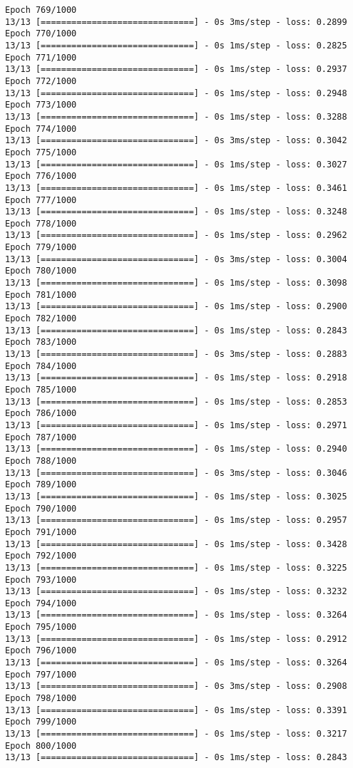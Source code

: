 \documentclass[11pt]{article}
\begin{document}
\begin{Verbatim}[commandchars=\\\{\}]
Epoch 769/1000
13/13 [==============================] - 0s 3ms/step - loss: 0.2899
Epoch 770/1000
13/13 [==============================] - 0s 1ms/step - loss: 0.2825
Epoch 771/1000
13/13 [==============================] - 0s 1ms/step - loss: 0.2937
Epoch 772/1000
13/13 [==============================] - 0s 1ms/step - loss: 0.2948
Epoch 773/1000
13/13 [==============================] - 0s 1ms/step - loss: 0.3288
Epoch 774/1000
13/13 [==============================] - 0s 3ms/step - loss: 0.3042
Epoch 775/1000
13/13 [==============================] - 0s 1ms/step - loss: 0.3027
Epoch 776/1000
13/13 [==============================] - 0s 1ms/step - loss: 0.3461
Epoch 777/1000
13/13 [==============================] - 0s 1ms/step - loss: 0.3248
Epoch 778/1000
13/13 [==============================] - 0s 1ms/step - loss: 0.2962
Epoch 779/1000
13/13 [==============================] - 0s 3ms/step - loss: 0.3004
Epoch 780/1000
13/13 [==============================] - 0s 1ms/step - loss: 0.3098
Epoch 781/1000
13/13 [==============================] - 0s 1ms/step - loss: 0.2900
Epoch 782/1000
13/13 [==============================] - 0s 1ms/step - loss: 0.2843
Epoch 783/1000
13/13 [==============================] - 0s 3ms/step - loss: 0.2883
Epoch 784/1000
13/13 [==============================] - 0s 1ms/step - loss: 0.2918
Epoch 785/1000
13/13 [==============================] - 0s 1ms/step - loss: 0.2853
Epoch 786/1000
13/13 [==============================] - 0s 1ms/step - loss: 0.2971
Epoch 787/1000
13/13 [==============================] - 0s 1ms/step - loss: 0.2940
Epoch 788/1000
13/13 [==============================] - 0s 3ms/step - loss: 0.3046
Epoch 789/1000
13/13 [==============================] - 0s 1ms/step - loss: 0.3025
Epoch 790/1000
13/13 [==============================] - 0s 1ms/step - loss: 0.2957
Epoch 791/1000
13/13 [==============================] - 0s 1ms/step - loss: 0.3428
Epoch 792/1000
13/13 [==============================] - 0s 1ms/step - loss: 0.3225
Epoch 793/1000
13/13 [==============================] - 0s 1ms/step - loss: 0.3232
Epoch 794/1000
13/13 [==============================] - 0s 1ms/step - loss: 0.3264
Epoch 795/1000
13/13 [==============================] - 0s 1ms/step - loss: 0.2912
Epoch 796/1000
13/13 [==============================] - 0s 1ms/step - loss: 0.3264
Epoch 797/1000
13/13 [==============================] - 0s 3ms/step - loss: 0.2908
Epoch 798/1000
13/13 [==============================] - 0s 1ms/step - loss: 0.3391
Epoch 799/1000
13/13 [==============================] - 0s 1ms/step - loss: 0.3217
Epoch 800/1000
13/13 [==============================] - 0s 1ms/step - loss: 0.2843

\end{Verbatim}
\end{document}
